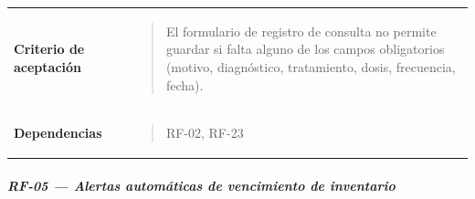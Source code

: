 \documentclass[
]{article}
\begin{document}
{\begin{longtable}[]{@{}
  >{\raggedright\arraybackslash}p{}
  >{\raggedright\arraybackslash}p{}@{}}
\textbf{Criterio de aceptación} &
\begin{minipage}[t]{\linewidth}\raggedright
\begin{quote}
El formulario de registro de consulta no permite guardar si falta alguno
de los campos obligatorios (motivo, diagnóstico, tratamiento, dosis,
frecuencia, fecha).
\end{quote}
\end{minipage} \\
\textbf{Dependencias} & \begin{minipage}[t]{\linewidth}\raggedright
\begin{quote}
RF-02, RF-23
\end{quote}
\end{minipage} \\
\end{longtable}
}

\subparagraph{RF-05 --- Alertas automáticas de vencimiento de
inventario}\label{rf-05-alertas-automuxe1ticas-de-vencimiento-de-inventario}
\end{document}
